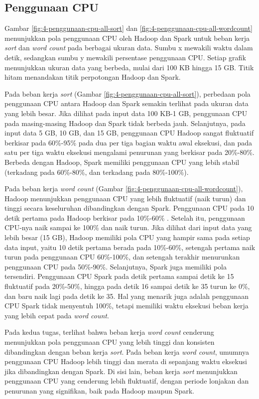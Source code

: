 \subsection{Penggunaan CPU}
Gambar \ref{fig:4-penggunaan-cpu-all-sort} dan \ref{fig:4-penggunaan-cpu-all-wordcount} menunjukkan pola penggunaan CPU oleh Hadoop dan Spark untuk beban kerja \textit{sort} dan \textit{word count} pada berbagai ukuran data. Sumbu x mewakili waktu dalam detik, sedangkan sumbu y mewakili persentase penggunaan CPU. Setiap grafik menunjukkan ukuran data yang berbeda, mulai dari 100 KB hingga 15 GB. Titik hitam menandakan titik perpotongan Hadoop dan Spark.

Pada beban kerja \textit{sort} (Gambar \ref{fig:4-penggunaan-cpu-all-sort}), perbedaan pola penggunaan CPU antara Hadoop dan Spark semakin terlihat pada ukuran data yang lebih besar. Jika dilihat pada input data 100 KB-1 GB, penggunaan CPU pada masing-masing Hadoop dan Spark tidak berbeda jauh. Selanjutnya, pada input data 5 GB, 10 GB, dan 15 GB, penggunaan CPU Hadoop sangat fluktuatif berkisar pada 60\%-95\% pada dua per tiga bagian waktu awal eksekusi, dan pada satu per tiga waktu eksekusi mengalami penurunan yang berkisar pada 20\%-80\%. Berbeda dengan Hadoop, Spark memiliki penggunaan CPU yang lebih stabil (terkadang pada 60\%-80\%, dan terkadang pada 80\%-100\%).

Pada beban kerja \textit{word count} (Gambar \ref{fig:4-penggunaan-cpu-all-wordcount}), Hadoop menunjukkan penggunaan CPU yang lebih fluktuatif (naik turun) dan tinggi secara keseluruhan dibandingkan dengan Spark. Penggunaan CPU pada 10 detik pertama pada Hadoop berkisar pada 10\%-60\% . Setelah itu, penggunaan CPU-nya naik sampai ke 100\% dan naik turun. Jika dilihat dari input data yang lebih besar (15 GB), Hadoop memiliki pola CPU yang hampir sama pada setiap data input, yaitu 10 detik pertama berada pada 10\%-60\%, setengah pertama naik turun pada penggunaan CPU 60\%-100\%, dan setengah terakhir menurunkan penggunaan CPU pada 50\%-90\%. Selanjutnya, Spark juga memiliki pola tersendiri. Penggunaan CPU Spark pada detik pertama sampai detik ke 15 fluktuatif pada 20\%-50\%, hingga pada detik 16 sampai detik ke 35 turun ke 0\%, dan baru naik lagi pada detik ke 35. Hal yang menarik juga adalah penggunaan CPU Spark tidak menyentuh 100\%, tetapi memiliki waktu eksekusi beban kerja yang lebih cepat pada \textit{word count}. 

Pada kedua tugas, terlihat bahwa beban kerja \textit{word count} cenderung menunjukkan pola penggunaan CPU yang lebih tinggi dan konsisten dibandingkan dengan beban kerja \textit{sort}. Pada beban kerja \textit{word count}, umumnya penggunaan CPU Hadoop lebih tinggi dan merata di sepanjang waktu eksekusi jika dibandingkan dengan Spark. Di sisi lain, beban kerja \textit{sort} menunjukkan penggunaan CPU yang cenderung lebih fluktuatif, dengan periode lonjakan dan penurunan yang signifikan, baik pada Hadoop maupun Spark. 

